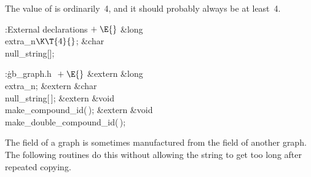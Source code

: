 The value of  is ordinarily~4, and it should probably
always be at
least~4.

\Y\B\4:External declarations\X${}\mathrel+\E{}$\6
\&{long} \\{extra\_n}${}\K\T{4}{}$;\6
\&{char} \\{null\_string}[];\par
\fi

\B{}:\.{gb\_graph.h }\X${}\mathrel+\E{}$\6
\&{extern} \&{long} \\{extra\_n};\6
\&{extern} \&{char} \\{null\_string}[\,];\6
\&{extern} \&{void} \\{make\_compound\_id}(\,);\6
\&{extern} \&{void} \\{make\_double\_compound\_id}(\,);\par
\fi

The  field of a graph is sometimes manufactured from the  field
of another graph. The following routines do this without allowing the
string to get too long after repeated copying.

